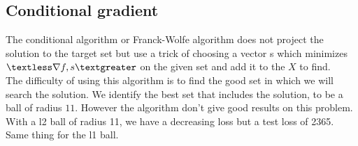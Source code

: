 \documentclass{article}
\begin{document}
    \subsection{Conditional gradient}
        The conditional algorithm or Franck-Wolfe algorithm does not project the solution to the target set but use a trick of choosing a vector s which minimizes $\textless \nabla f , s \textgreater $ on the given set and add it to the $X$ to find. \\
        
        The difficulty of using this algorithm is to  find the good set in which we will search the solution. We identify the best set that includes the solution, to be a  ball of radius $11$. However the algorithm don't give good results on this problem. \\
        
        With a l2 ball of radius 11, we have a decreasing loss but a test loss of 2365. Same thing for the l1 ball.
        \\
        
\end{document}
